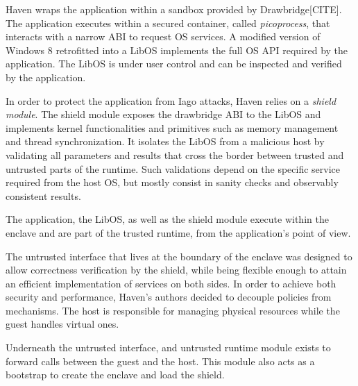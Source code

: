 Haven wraps the application within a sandbox provided by Drawbridge[CITE].
The application executes within a secured container, called \emph{picoprocess}, that interacts with a narrow ABI to request OS services.
A modified version of Windows 8 retrofitted into a LibOS implements the full OS API required by the application.
The LibOS is under user control and can be inspected and verified by the application.

In order to protect the application from Iago attacks, Haven relies on a \emph{shield module}.
The shield module exposes the drawbridge ABI to the LibOS and implements kernel functionalities and primitives such as memory management and thread synchronization.
It isolates the LibOS from a malicious host by validating all parameters and results that cross the border between trusted and untrusted parts of the runtime.
Such validations depend on the specific service required from the host OS, but mostly consist in sanity checks and observably consistent results.

The application, the LibOS, as well as the shield module execute within the enclave and are part of the trusted runtime, from the application's point of view.

The untrusted interface that lives at the boundary of the enclave was designed to allow correctness verification by the shield, while being flexible enough to attain an efficient implementation of services on both sides.
In order to achieve both security and performance, Haven's authors decided to decouple policies from mechanisms.
The host is responsible for managing physical resources while the guest handles virtual ones.

Underneath the untrusted interface, and untrusted runtime module exists to forward calls between the guest and the host.
This module also acts as a bootstrap to create the enclave and load the shield.



